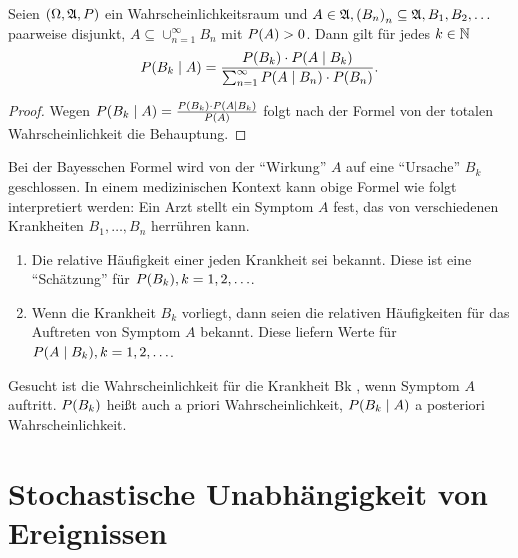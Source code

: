 \documentclass{lecture}
\begin{document}
    \begin{lemma}
        Seien \(\parentheses*{\Omega, \mathfrak{A}, P}\) ein Wahrscheinlichkeitsraum und \(A \in \mathfrak{A}, \parentheses*{B_n}_n \subseteq \mathfrak{A}, B_1, B_2, \ldots\) paarweise disjunkt, \(A \subseteq \cup_{n = 1}^\infty B_n\) mit \(P\parentheses*{A} > 0\).
        Dann gilt für jedes \(k \in \N\)
        \[
            P\parentheses*{B_k \mid A} = \frac{P\parentheses*{B_k} \cdot P\parentheses*{A \mid B_k}}{\sum_{n = 1}^\infty P\parentheses*{A \mid B_n} \cdot P\parentheses*{B_n}}.
        \]
    \end{lemma}

    \begin{proof}
        Wegen \(P\parentheses*{B_k \mid A} = \frac{P\parentheses*{B_k} \cdot P\parentheses*{A \mid B_k}}{P\parentheses*{A}}\) folgt nach der Formel von der totalen Wahrscheinlichkeit die Behauptung.
    \end{proof}

    Bei der Bayesschen Formel wird von der ``Wirkung'' \(A\) auf eine ``Ursache'' \(B_k\) geschlossen.
    In einem medizinischen Kontext kann obige Formel wie folgt interpretiert werden: Ein Arzt stellt ein Symptom \(A\) fest, das von verschiedenen Krankheiten \(B_1, \ldots, B_n\) herrühren kann.
    \begin{enumerate}[label=(\roman*)]
        \item Die relative Häufigkeit einer jeden Krankheit sei bekannt.
        Diese ist eine ``Schätzung'' für \(P\parentheses*{B_k}, k = 1, 2, \ldots\).
        \item Wenn die Krankheit \(B_k\) vorliegt, dann seien die relativen Häufigkeiten für das Auftreten von Symptom \(A\) bekannt.
        Diese liefern Werte für \(P\parentheses*{A \mid B_k}, k = 1, 2, \ldots\).
    \end{enumerate}
    Gesucht ist die Wahrscheinlichkeit für die Krankheit Bk , wenn Symptom \(A\) auftritt.
    \(P\parentheses*{B_k}\) heißt auch a priori Wahrscheinlichkeit, \(P\parentheses*{B_k \mid A}\) a posteriori Wahrscheinlichkeit.


    \section*{Stochastische Unabhängigkeit von Ereignissen}
\end{document}
